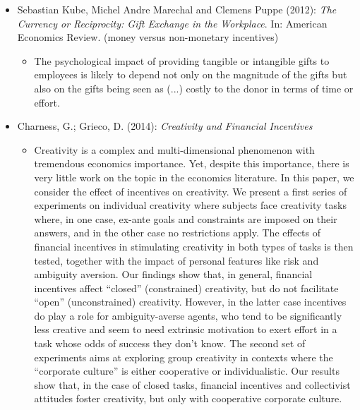 \begin{itemize}
\begin{itemize}
		\end{itemize}
	\item Sebastian Kube, Michel Andre Marechal and Clemens Puppe (2012): \textit{The Currency or Reciprocity: Gift Exchange in the Workplace}. In: American Economics Review. (money versus non-monetary incentives)
		\begin{itemize}
			\item The psychological impact of providing tangible or intangible gifts to employees is likely to depend not only on the magnitude of the gifts but also on the gifts being seen as (...) costly to the donor in terms of time or effort.
		\end{itemize}
	\item Charness, G.; Grieco, D. (2014): \textit{Creativity and Financial Incentives} 
		\begin{itemize}
			\item Creativity is a complex and multi-dimensional phenomenon with tremendous economics importance. Yet, despite this importance, there is very little work on the topic in the economics literature. In this paper, we consider the effect of incentives on creativity. We present a first series of experiments on individual creativity where subjects face creativity tasks where, in one case, ex-ante goals and constraints are imposed on their answers, and in the other case no restrictions apply. The effects of financial incentives in stimulating creativity in both types of tasks is then tested, together with the impact of personal features like risk and ambiguity aversion. Our findings show that, in general, financial incentives affect “closed” (constrained) creativity, but do not facilitate “open” (unconstrained) creativity. However, in the latter case incentives do play a role for ambiguity-averse agents, who tend to be significantly less creative and seem to need extrinsic motivation to exert effort in a task whose odds of success they don’t know. The second set of experiments aims at exploring group creativity in contexts where the “corporate culture” is either cooperative or individualistic. Our results show that, in the case of closed tasks, financial incentives and collectivist attitudes foster creativity, but only with cooperative corporate culture.
		\end{itemize}
\end{itemize}


\newpage